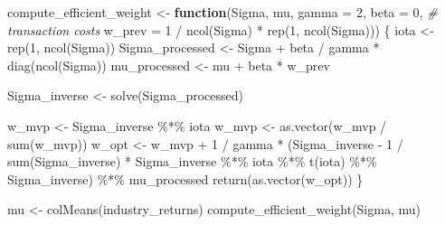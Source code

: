 \documentclass[
]{book}
\newenvironment{Shaded}{\begin{snugshade}}{\end{snugshade}}
\newcommand{\AttributeTok}[1]{\textcolor[rgb]{0.61,0.61,0.61}{#1}}
\newcommand{\CommentTok}[1]{\textcolor[rgb]{0.37,0.37,0.37}{\textit{#1}}}
\newcommand{\ControlFlowTok}[1]{\textcolor[rgb]{0.27,0.27,0.27}{\textbf{#1}}}
\newcommand{\DecValTok}[1]{\textcolor[rgb]{0.06,0.06,0.06}{#1}}
\newcommand{\FunctionTok}[1]{\textcolor[rgb]{0,0,0}{#1}}
\newcommand{\NormalTok}[1]{#1}
\newcommand{\OtherTok}[1]{\textcolor[rgb]{0.37,0.37,0.37}{#1}}
\newcommand{\SpecialCharTok}[1]{\textcolor[rgb]{0,0,0}{#1}}
\begin{document}
\begin{Shaded}
\begin{Highlighting}[]
\NormalTok{compute\_efficient\_weight }\OtherTok{\textless{}{-}} \ControlFlowTok{function}\NormalTok{(Sigma,}
\NormalTok{                                     mu,}
                                     \AttributeTok{gamma =} \DecValTok{2}\NormalTok{,}
                                     \AttributeTok{beta =} \DecValTok{0}\NormalTok{, }\CommentTok{\# transaction costs}
                                     \AttributeTok{w\_prev =} \DecValTok{1} \SpecialCharTok{/} \FunctionTok{ncol}\NormalTok{(Sigma) }\SpecialCharTok{*} \FunctionTok{rep}\NormalTok{(}\DecValTok{1}\NormalTok{, }\FunctionTok{ncol}\NormalTok{(Sigma))) \{}
\NormalTok{  iota }\OtherTok{\textless{}{-}} \FunctionTok{rep}\NormalTok{(}\DecValTok{1}\NormalTok{, }\FunctionTok{ncol}\NormalTok{(Sigma))}
\NormalTok{  Sigma\_processed }\OtherTok{\textless{}{-}}\NormalTok{ Sigma }\SpecialCharTok{+}\NormalTok{ beta }\SpecialCharTok{/}\NormalTok{ gamma }\SpecialCharTok{*} \FunctionTok{diag}\NormalTok{(}\FunctionTok{ncol}\NormalTok{(Sigma))}
\NormalTok{  mu\_processed }\OtherTok{\textless{}{-}}\NormalTok{ mu }\SpecialCharTok{+}\NormalTok{ beta }\SpecialCharTok{*}\NormalTok{ w\_prev}

\NormalTok{  Sigma\_inverse }\OtherTok{\textless{}{-}} \FunctionTok{solve}\NormalTok{(Sigma\_processed)}

\NormalTok{  w\_mvp }\OtherTok{\textless{}{-}}\NormalTok{ Sigma\_inverse }\SpecialCharTok{\%*\%}\NormalTok{ iota}
\NormalTok{  w\_mvp }\OtherTok{\textless{}{-}} \FunctionTok{as.vector}\NormalTok{(w\_mvp }\SpecialCharTok{/} \FunctionTok{sum}\NormalTok{(w\_mvp))}
\NormalTok{  w\_opt }\OtherTok{\textless{}{-}}\NormalTok{ w\_mvp }\SpecialCharTok{+} \DecValTok{1} \SpecialCharTok{/}\NormalTok{ gamma }\SpecialCharTok{*}
\NormalTok{    (Sigma\_inverse }\SpecialCharTok{{-}} \DecValTok{1} \SpecialCharTok{/} \FunctionTok{sum}\NormalTok{(Sigma\_inverse) }\SpecialCharTok{*}\NormalTok{ Sigma\_inverse }\SpecialCharTok{\%*\%}\NormalTok{ iota }\SpecialCharTok{\%*\%} \FunctionTok{t}\NormalTok{(iota) }\SpecialCharTok{\%*\%}\NormalTok{ Sigma\_inverse) }\SpecialCharTok{\%*\%}
\NormalTok{      mu\_processed}
  \FunctionTok{return}\NormalTok{(}\FunctionTok{as.vector}\NormalTok{(w\_opt))}
\NormalTok{\}}

\NormalTok{mu }\OtherTok{\textless{}{-}} \FunctionTok{colMeans}\NormalTok{(industry\_returns)}
\FunctionTok{compute\_efficient\_weight}\NormalTok{(Sigma, mu)}
\end{Highlighting}
\end{Shaded}
\end{document}
